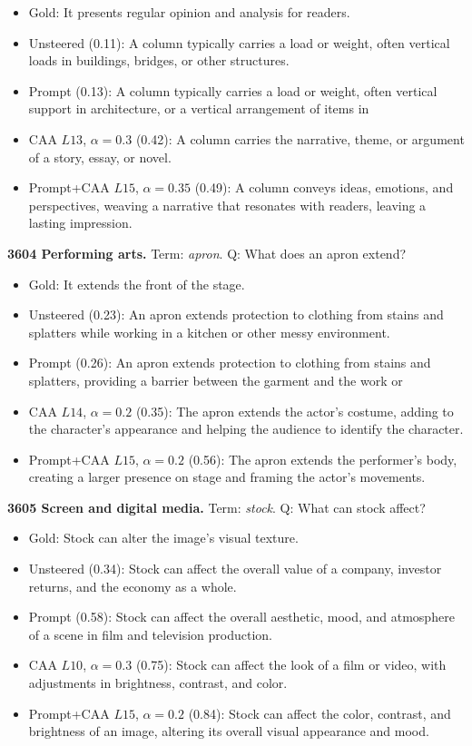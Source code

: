 \begin{itemize}\setlength{\itemsep}{0.15em}\setlength{\parsep}{0pt}\setlength{\topsep}{0.2em}
\item Gold: It presents regular opinion and analysis for readers.
\item Unsteered (0.11): A column typically carries a load or weight, often vertical loads in buildings, bridges, or other structures.
\item Prompt (0.13): A column typically carries a load or weight, often vertical support in architecture, or a vertical arrangement of items in
\item CAA $L13$, $\alpha=0.3$ (0.42): A column carries the narrative, theme, or argument of a story, essay, or novel.
\item Prompt+CAA $L15$, $\alpha=0.35$ (0.49): A column conveys ideas, emotions, and perspectives, weaving a narrative that resonates with readers, leaving a lasting impression.
\end{itemize}
\medskip\noindent\textbf{3604 Performing arts.} Term: \emph{apron}.
Q: What does an apron extend?
\begin{itemize}\setlength{\itemsep}{0.15em}\setlength{\parsep}{0pt}\setlength{\topsep}{0.2em}
\item Gold: It extends the front of the stage.
\item Unsteered (0.23): An apron extends protection to clothing from stains and splatters while working in a kitchen or other messy environment.
\item Prompt (0.26): An apron extends protection to clothing from stains and splatters, providing a barrier between the garment and the work or
\item CAA $L14$, $\alpha=0.2$ (0.35): The apron extends the actor's costume, adding to the character's appearance and helping the audience to identify the character.
\item Prompt+CAA $L15$, $\alpha=0.2$ (0.56): The apron extends the performer's body, creating a larger presence on stage and framing the actor's movements.
\end{itemize}
\medskip\noindent\textbf{3605 Screen and digital media.} Term: \emph{stock}.
Q: What can stock affect?
\begin{itemize}\setlength{\itemsep}{0.15em}\setlength{\parsep}{0pt}\setlength{\topsep}{0.2em}
\item Gold: Stock can alter the image's visual texture.
\item Unsteered (0.34): Stock can affect the overall value of a company, investor returns, and the economy as a whole.
\item Prompt (0.58): Stock can affect the overall aesthetic, mood, and atmosphere of a scene in film and television production.
\item CAA $L10$, $\alpha=0.3$ (0.75): Stock can affect the look of a film or video, with adjustments in brightness, contrast, and color.
\item Prompt+CAA $L15$, $\alpha=0.2$ (0.84): Stock can affect the color, contrast, and brightness of an image, altering its overall visual appearance and mood.
\end{itemize}
